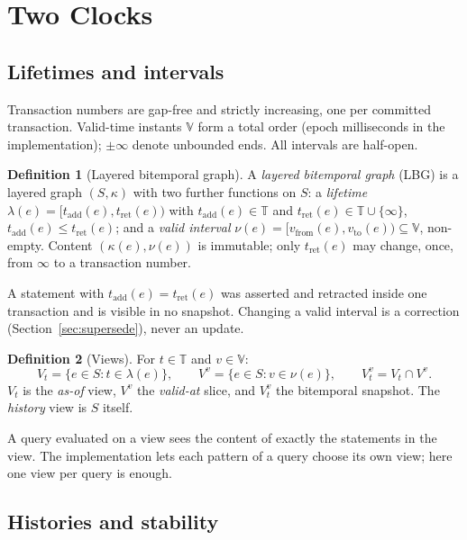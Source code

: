 \documentclass[11pt]{article}
\theoremstyle{plain}
\theoremstyle{definition}
\newtheorem{definition}{Definition}
\theoremstyle{remark}
\newcommand{\TT}{\mathbb{T}}             %
\newcommand{\VT}{\mathbb{V}}             %
\newcommand{\life}{\lambda}              %
\newcommand{\valid}{\nu}                 %
\newcommand{\tadd}{t_{\mathrm{add}}}
\newcommand{\tret}{t_{\mathrm{ret}}}
\newcommand{\View}[2]{V_{#1}^{#2}}
\begin{document}
\section{Two Clocks}\label{sec:time}

\subsection{Lifetimes and intervals}

Transaction numbers are gap-free and strictly increasing, one per committed
transaction. Valid-time instants $\VT$ form a total order (epoch milliseconds in
the implementation); $\pm\infty$ denote unbounded ends. All intervals are
half-open.

\begin{definition}[Layered bitemporal graph]
A \emph{layered bitemporal graph} (LBG) is a layered graph $(S,\kappa)$ with two
further functions on $S$: a \emph{lifetime}
$\life(e)=[\tadd(e),\tret(e))$ with $\tadd(e)\in\TT$ and
$\tret(e)\in\TT\cup\{\infty\}$, $\tadd(e)\le\tret(e)$; and a \emph{valid
interval} $\valid(e)=[v_{\mathrm{from}}(e),v_{\mathrm{to}}(e))\subseteq\VT$,
non-empty. Content $(\kappa(e),\valid(e))$ is immutable; only
$\tret(e)$ may change, once, from $\infty$ to a transaction number.
\end{definition}

A statement with $\tadd(e)=\tret(e)$ was asserted and retracted inside one
transaction and is visible in no snapshot. Changing a valid interval is a
correction (Section~\ref{sec:supersede}), never an update.

\begin{definition}[Views]
For $t\in\TT$ and $v\in\VT$:
\[
V_t=\{e\in S: t\in\life(e)\},\qquad
V^{v}=\{e\in S: v\in\valid(e)\},\qquad
\View{t}{v}=V_t\cap V^{v}.
\]
$V_t$ is the \emph{as-of} view, $V^{v}$ the \emph{valid-at} slice, and
$\View{t}{v}$ the bitemporal snapshot. The \emph{history} view is $S$ itself.
\end{definition}

A query evaluated on a view sees the content of exactly the statements in the
view. The implementation lets each pattern of a query choose its own view;
here one view per query is enough.

\subsection{Histories and stability}
\end{document}
